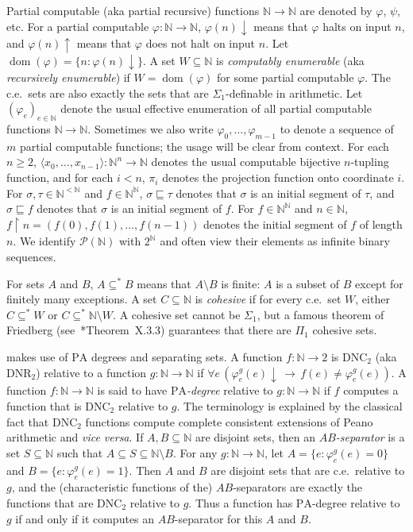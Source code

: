 \documentclass[11pt,a4paper,reqno]{amsart}
\theoremstyle{definition}
\DeclareMathOperator{\dom}{\mathrm{dom}}
\newcommand{\pa}{\mathrm{PA}}
\newcommand{\dnc}{\mathrm{DNC}}
\newcommand{\dnr}{\mathrm{DNR}}
\newcommand{\la}{\langle}
\newcommand{\ra}{\rangle}
\newcommand{\da}{{\downarrow}}
\newcommand{\ua}{{\uparrow}}
\newcommand{\imp}{\rightarrow}
\newcommand{\Nb}{\mathbb{N}}
\newcommand{\rst}{{\restriction}}
\newcommand{\mc}[1]{\mathcal{#1}}
\begin{document}
Partial computable (aka partial recursive) functions $\Nb \to \Nb$ are denoted by $\varphi$, $\psi$, etc.  For a partial computable $\varphi : \Nb \to \Nb$, $\varphi(n)\da$ means that $\varphi$ halts on input $n$, and $\varphi(n)\ua$ means that $\varphi$ does not halt on input $n$.  Let $\dom(\varphi) = \{n : \varphi(n)\da\}$.  A set $W \subseteq \Nb$ is \emph{computably enumerable} (aka \emph{recursively enumerable}) if $W = \dom(\varphi)$ for some partial computable $\varphi$.  The c.e.\ sets are also exactly the sets that are $\Sigma_1$-definable in arithmetic.  Let $(\varphi_e)_{e \in \Nb}$ denote the usual effective enumeration of all partial computable functions $\Nb \to \Nb$.  Sometimes we also write $\varphi_0, \dots, \varphi_{m-1}$ to denote a sequence of $m$ partial computable functions; the usage will be clear from context.  For each $n \geq 2$, $\la x_0, \dots, x_{n-1} \ra \colon \Nb^n \imp \Nb$ denotes the usual computable bijective $n$\nobreakdash-tupling function, and for each $i < n$, $\pi_i$ denotes the projection function onto coordinate $i$.  For $\sigma, \tau \in \Nb^{<\Nb}$ and $f \in \Nb^\Nb$, $\sigma \sqsubseteq \tau$ denotes that $\sigma$ is an initial segment of $\tau$, and $\sigma \sqsubseteq f$ denotes that $\sigma$ is an initial segment of $f$.  For $f \in \Nb^\Nb$ and $n \in \Nb$, $f \rst n = (f(0), f(1), \dots, f(n-1))$ denotes the initial segment of $f$ of length $n$.  We identify $\mc{P}(\Nb)$ with $2^\Nb$ and often view their elements as infinite binary sequences.

For sets $A$ and $B$, $A \subseteq^* B$ means that $A \setminus B$ is finite:  $A$ is a subset of $B$ except for finitely many exceptions.  A set $C \subseteq \Nb$ is \emph{cohesive} if for every c.e.\ set $W$, either $C \subseteq^* W$ or $C \subseteq^* \Nb \setminus W$.  A cohesive set cannot be $\Sigma_1$, but a famous theorem of Friedberg (see~\cite{SoareBookRE}*{Theorem~X.3.3}) guarantees that there are $\Pi_1$ cohesive sets.

 makes use of $\pa$ degrees and separating sets.  A function $f \colon \Nb \to 2$ is $\dnc_2$ (aka $\dnr_2$) relative to a function $g \colon \Nb \to \Nb$ if $\forall e\, (\varphi_e^g(e)\da \,\imp\, f(e) \neq \varphi_e^g(e))$.  A function $f \colon \Nb \to \Nb$ is said to have \emph{$\pa$-degree} relative to $g \colon \Nb \to \Nb$ if $f$ computes a function that is $\dnc_2$ relative to $g$.  The terminology is explained by the classical fact that $\dnc_2$ functions compute complete consistent extensions of Peano arithmetic and \emph{vice versa}.  If $A, B \subseteq \Nb$ are disjoint sets, then an \emph{$AB$-separator} is a set $S \subseteq \Nb$ such that $A \subseteq S \subseteq \Nb \setminus B$.  For any $g \colon \Nb \to \Nb$, let $A = \{e : \varphi_e^g(e) = 0\}$ and $B = \{e : \varphi_e^g(e) = 1\}$.  Then $A$ and $B$ are disjoint sets that are c.e.\ relative to $g$, and the (characteristic functions of the) $AB$-separators are exactly the functions that are $\dnc_2$ relative to $g$.  Thus a function has $\pa$-degree relative to $g$ if and only if it computes an $AB$-separator for this $A$ and $B$.
\end{document}
